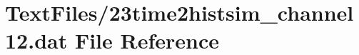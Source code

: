 \hypertarget{23time2histsim__channel12_8dat}{}\section{Text\+Files/23time2histsim\+\_\+channel12.dat File Reference}
\label{23time2histsim__channel12_8dat}
